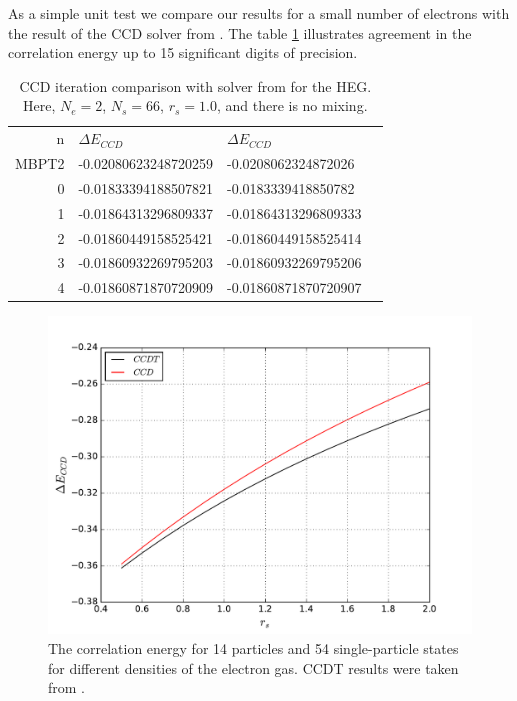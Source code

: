 \documentclass[twoside,english]{uiofysmaster}
\begin{document}
As a simple unit test we compare our results for a small number of electrons with the result of the CCD solver from \cite{Hjorth-Jensenadvancedcoursecomputational2017}. The table \ref{tab:unittest} illustrates agreement in the correlation energy up to 15 significant digits of precision.

\begin{table}[h]
	\centering
	\captionsetup{width=.8\textwidth}
	\caption{CCD iteration comparison with solver from \cite{Hjorth-Jensenadvancedcoursecomputational2017} for the HEG. Here, $N_e=2$, $N_s=66$, $r_s=1.0$, and there is no mixing. }
	\begin{tabular}{rlll}
		n & $\Delta E_{CCD}$     & $\Delta E_{CCD}$ \cite{Hjorth-Jensenadvancedcoursecomputational2017} \\
		MBPT2 & -0.02080623248720259 & -0.0208062324872026  \\
		0 & -0.01833394188507821 & -0.0183339418850782  \\
		1 & -0.01864313296809337 & -0.01864313296809333 \\
		2 & -0.01860449158525421 & -0.01860449158525414 \\
		3 & -0.01860932269795203 & -0.01860932269795206 \\
		4 & -0.01860871870720909 & -0.01860871870720907 \\
	\end{tabular}
	\label{tab:unittest}
\end{table}

\begin{figure}[ht!]
	\centering
	\includegraphics[width=0.8\linewidth]{CCDvsCCDT}
	\caption{The correlation energy for 14 particles and 54 single-particle states for different densities of the electron gas. CCDT results were taken from \cite{HansenCoupledclusterstudies}.}
	\label{fig:CCDvsCCDT}
\end{figure}
\end{document}
